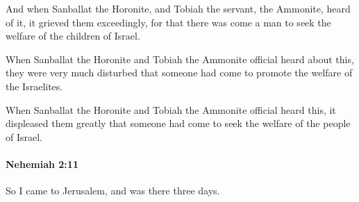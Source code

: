 			\begin{versebox}
					\item[BHS] 
					\item[LXX] 
					\item[ASV] And when Sanballat the Horonite, and Tobiah the servant, the Ammonite, heard of it, it grieved them exceedingly, for that there was come a man to seek the welfare of the children of Israel.
					\item[NIV] When Sanballat the Horonite and Tobiah the Ammonite official heard about this, they were very much disturbed that someone had come to promote the welfare of the Israelites.
					\item[NRSV] When Sanballat the Horonite and Tobiah the Ammonite official heard this, it displeased them greatly that someone had come to seek the welfare of the people of Israel.
			\end{versebox}

		\paragraph{Nehemiah 2:11} %
			\label{NEHEMIAH-2-11}

			So I came to Jerusalem, and was there three days.

